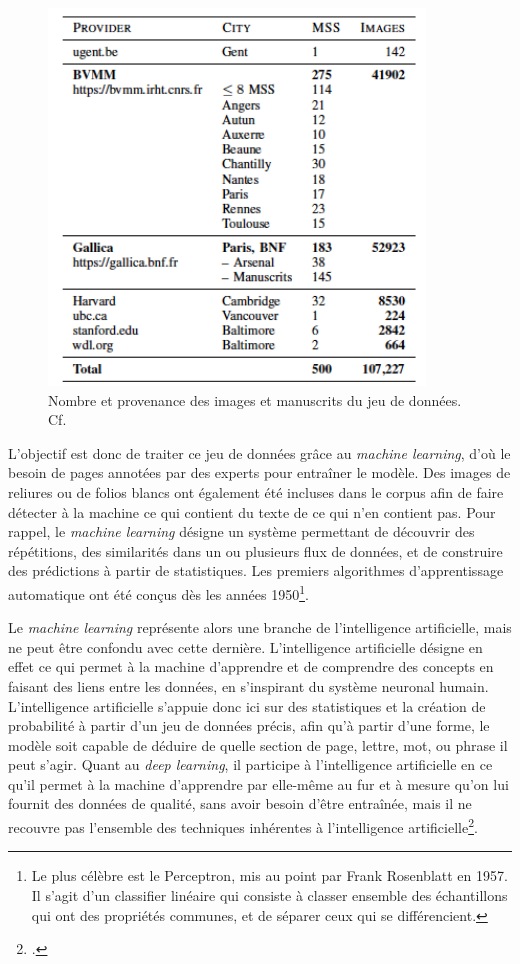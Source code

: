 \documentclass[a4paper,12pt,twoside]{book}
\begin{document}
	\begin{figure}[!h]
    \centering
    \includegraphics[width=10cm]{img/ML/provenance_dataset_annotated.png}
    \caption{Nombre et provenance des images et manuscrits du jeu de données. Cf. \cite[p. 8]{annotated_dataset_book_hours}}
    \end{figure}
    \clearpage
    
    L'objectif est donc de traiter ce jeu de données grâce au \textit{machine learning}, d'où le besoin de pages annotées par des experts pour entraîner le modèle. Des images de reliures ou de folios blancs ont également été incluses dans le corpus afin de faire détecter à la machine ce qui contient du texte de ce qui n'en contient pas. Pour rappel, le \textit{machine learning} désigne un système permettant de découvrir des répétitions, des similarités dans un ou plusieurs flux de données, et de construire des prédictions à partir de statistiques. Les premiers algorithmes d'apprentissage automatique ont été conçus dès les années 1950\footnote{Le plus célèbre est le Perceptron, mis au point par Frank Rosenblatt en 1957. Il s'agit d'un classifier linéaire qui consiste à classer ensemble des échantillons qui ont des propriétés communes, et de séparer ceux qui se différencient.}.
    
    Le \textit{machine learning} représente alors une branche de l'intelligence artificielle, mais ne peut être confondu avec cette dernière. L'intelligence artificielle désigne en effet ce qui permet à la machine d'apprendre et de comprendre des concepts en faisant des liens entre les données, en s'inspirant du système neuronal humain. L'intelligence artificielle s'appuie donc ici sur des statistiques et la création de probabilité à partir d'un jeu de données précis, afin qu'à partir d'une forme, le modèle soit capable de déduire de quelle section de page, lettre, mot, ou phrase il peut s'agir. Quant au \textit{deep learning}, il participe à l'intelligence artificielle en ce qu'il permet à la machine d'apprendre par elle-même au fur et à mesure qu'on lui fournit des données de qualité, sans avoir besoin d'être entraînée, mais il ne recouvre pas l'ensemble des techniques inhérentes à l'intelligence artificielle\footcite{Automatisation_ML}. \\
    
\end{document}
